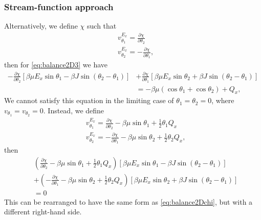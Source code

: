 \documentclass[11pt,reqno]{amsart}
\begin{document}
\subsubsection{Stream-function approach}
Alternatively, we define $\chi$ such that
\begin{subequations}
\label{eq:chiDef}
\begin{align}
&{ v}^{E_x}_{\theta_1}=\frac{\partial \chi}{\partial \theta_2}\\
&{ v}^{E_x}_{\theta_2}=-\frac{\partial \chi}{\partial \theta_1},
\end{align}
\end{subequations}
then for \eqref{eq:balance2D3} we have
\begin{align}
\label{eq:balance2Dchi}
- \frac{\partial \chi}{\partial \theta_2} [\beta\mu E_x \sin\theta_1 - \beta J \sin(\theta_2-\theta_1)]&+ \frac{\partial \chi}{\partial\theta_1} [\beta\mu E_x \sin\theta_2 + \beta J \sin(\theta_2-\theta_1)]\nonumber\\
&= -\beta\mu(\cos\theta_1+\cos\theta_2) + Q_x,
\end{align}
We cannot satisfy this equation in the limiting case of $\theta_1 = \theta_2 = 0$, where $v_{\theta_1} = v_{\theta_2} = 0$. Instead, we define
\begin{subequations}
\label{eq:chiDef2}
\begin{align}
&{ v}^{E_x}_{\theta_1}=\frac{\partial \chi}{\partial \theta_2}-\beta\mu\sin\theta_1 + \frac{1}{2}\theta_1 Q_x\\
&{ v}^{E_x}_{\theta_2}=-\frac{\partial \chi}{\partial \theta_1}-\beta\mu\sin\theta_2 + \frac{1}{2}\theta_2 Q_x,
\end{align}
\end{subequations}
then
\begin{align}
\label{eq:balance2Dchi2}
&\left(\frac{\partial \chi}{\partial \theta_2} -\beta\mu\sin\theta_1 + \frac{1}{2}\theta_1 Q_x\right)[\beta\mu E_x \sin\theta_1 - \beta J \sin(\theta_2-\theta_1)]\nonumber\\
&+ \left(-\frac{\partial \chi}{\partial\theta_1}-\beta\mu\sin\theta_2 + \frac{1}{2}\theta_2 Q_x\right) [\beta\mu E_x \sin\theta_2 + \beta J \sin(\theta_2-\theta_1)]\nonumber\\
&= 0
\end{align}
This can be rearranged to have the same form as \eqref{eq:balance2Dchi}, but with a different right-hand side.
\end{document}
